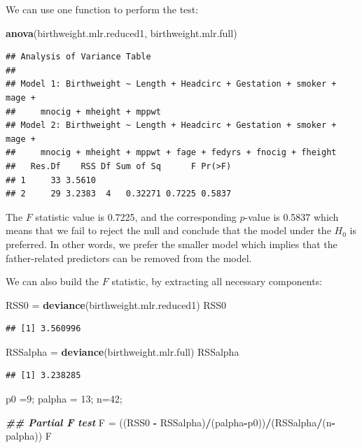 \documentclass[
]{book}
\newenvironment{Shaded}{\begin{snugshade}}{\end{snugshade}}
\newcommand{\DecValTok}[1]{\textcolor[rgb]{0.00,0.00,0.81}{#1}}
\newcommand{\DocumentationTok}[1]{\textcolor[rgb]{0.56,0.35,0.01}{\textbf{\textit{#1}}}}
\newcommand{\FunctionTok}[1]{\textcolor[rgb]{0.13,0.29,0.53}{\textbf{#1}}}
\newcommand{\NormalTok}[1]{#1}
\newcommand{\OtherTok}[1]{\textcolor[rgb]{0.56,0.35,0.01}{#1}}
\newcommand{\SpecialCharTok}[1]{\textcolor[rgb]{0.81,0.36,0.00}{\textbf{#1}}}
\begin{document}
We can use one function to perform the test:

\begin{Shaded}
\begin{Highlighting}[]
\FunctionTok{anova}\NormalTok{(birthweight.mlr.reduced1, birthweight.mlr.full)}
\end{Highlighting}
\end{Shaded}

\begin{verbatim}
## Analysis of Variance Table
## 
## Model 1: Birthweight ~ Length + Headcirc + Gestation + smoker + mage + 
##     mnocig + mheight + mppwt
## Model 2: Birthweight ~ Length + Headcirc + Gestation + smoker + mage + 
##     mnocig + mheight + mppwt + fage + fedyrs + fnocig + fheight
##   Res.Df    RSS Df Sum of Sq      F Pr(>F)
## 1     33 3.5610                           
## 2     29 3.2383  4   0.32271 0.7225 0.5837
\end{verbatim}

The \(F\) statistic value is 0.7225, and the corresponding \(p\)-value is 0.5837 which means that we fail to reject the null and conclude that the model under the \(H_0\) is preferred. In other words, we prefer the smaller model which implies that the father-related predictors can be removed from the model.

We can also build the \(F\) statistic, by extracting all necessary components:

\begin{Shaded}
\begin{Highlighting}[]
\NormalTok{RSS0 }\OtherTok{=} \FunctionTok{deviance}\NormalTok{(birthweight.mlr.reduced1)}
\NormalTok{RSS0}
\end{Highlighting}
\end{Shaded}

\begin{verbatim}
## [1] 3.560996
\end{verbatim}

\begin{Shaded}
\begin{Highlighting}[]
\NormalTok{RSSalpha }\OtherTok{=} \FunctionTok{deviance}\NormalTok{(birthweight.mlr.full)}
\NormalTok{RSSalpha}
\end{Highlighting}
\end{Shaded}

\begin{verbatim}
## [1] 3.238285
\end{verbatim}

\begin{Shaded}
\begin{Highlighting}[]
\NormalTok{p0 }\OtherTok{=}\DecValTok{9}\NormalTok{;}
\NormalTok{palpha }\OtherTok{=} \DecValTok{13}\NormalTok{;}
\NormalTok{n}\OtherTok{=}\DecValTok{42}\NormalTok{;}

\DocumentationTok{\#\# Partial F test}
\NormalTok{F }\OtherTok{=}\NormalTok{ ((RSS0 }\SpecialCharTok{{-}}\NormalTok{ RSSalpha)}\SpecialCharTok{/}\NormalTok{(palpha}\SpecialCharTok{{-}}\NormalTok{p0))}\SpecialCharTok{/}\NormalTok{(RSSalpha}\SpecialCharTok{/}\NormalTok{(n}\SpecialCharTok{{-}}\NormalTok{palpha))}
\NormalTok{F}
\end{Highlighting}
\end{Shaded}
\end{document}

